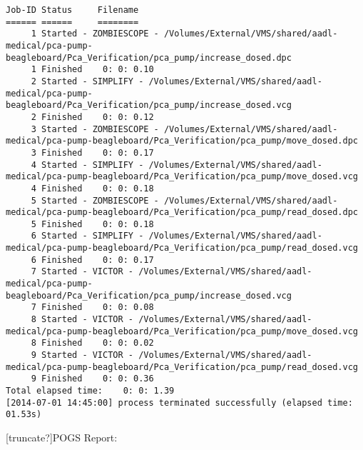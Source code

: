 \begin{lstlisting}[frame=single, gobble=0, caption={SPARKSimp output}, label={listing:pcapump_dosemonitor_sparksimp}]
Job-ID Status     Filename
====== ======     ========
     1 Started - ZOMBIESCOPE - /Volumes/External/VMS/shared/aadl-medical/pca-pump-beagleboard/Pca_Verification/pca_pump/increase_dosed.dpc
     1 Finished    0: 0: 0.10
     2 Started - SIMPLIFY - /Volumes/External/VMS/shared/aadl-medical/pca-pump-beagleboard/Pca_Verification/pca_pump/increase_dosed.vcg
     2 Finished    0: 0: 0.12
     3 Started - ZOMBIESCOPE - /Volumes/External/VMS/shared/aadl-medical/pca-pump-beagleboard/Pca_Verification/pca_pump/move_dosed.dpc
     3 Finished    0: 0: 0.17
     4 Started - SIMPLIFY - /Volumes/External/VMS/shared/aadl-medical/pca-pump-beagleboard/Pca_Verification/pca_pump/move_dosed.vcg
     4 Finished    0: 0: 0.18
     5 Started - ZOMBIESCOPE - /Volumes/External/VMS/shared/aadl-medical/pca-pump-beagleboard/Pca_Verification/pca_pump/read_dosed.dpc
     5 Finished    0: 0: 0.18
     6 Started - SIMPLIFY - /Volumes/External/VMS/shared/aadl-medical/pca-pump-beagleboard/Pca_Verification/pca_pump/read_dosed.vcg
     6 Finished    0: 0: 0.17
     7 Started - VICTOR - /Volumes/External/VMS/shared/aadl-medical/pca-pump-beagleboard/Pca_Verification/pca_pump/increase_dosed.vcg
     7 Finished    0: 0: 0.08
     8 Started - VICTOR - /Volumes/External/VMS/shared/aadl-medical/pca-pump-beagleboard/Pca_Verification/pca_pump/move_dosed.vcg
     8 Finished    0: 0: 0.02
     9 Started - VICTOR - /Volumes/External/VMS/shared/aadl-medical/pca-pump-beagleboard/Pca_Verification/pca_pump/read_dosed.vcg
     9 Finished    0: 0: 0.36
Total elapsed time:    0: 0: 1.39
[2014-07-01 14:45:00] process terminated successfully (elapsed time: 01.53s)
\end{lstlisting}

[truncate?]POGS Report:

